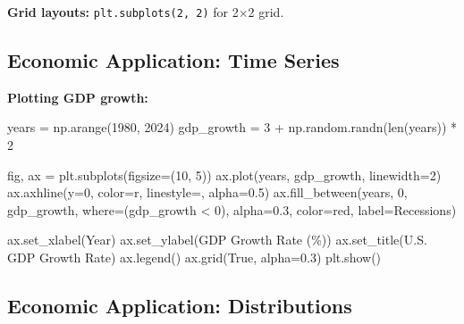 \documentclass[
  letterpaper,
  DIV=11,
  numbers=noendperiod]{scrartcl}
\newenvironment{Shaded}{\begin{snugshade}}{\end{snugshade}}
\newcommand{\BuiltInTok}[1]{\textcolor[rgb]{0.00,0.23,0.31}{#1}}
\newcommand{\DecValTok}[1]{\textcolor[rgb]{0.68,0.00,0.00}{#1}}
\newcommand{\FloatTok}[1]{\textcolor[rgb]{0.68,0.00,0.00}{#1}}
\newcommand{\NormalTok}[1]{\textcolor[rgb]{0.00,0.23,0.31}{#1}}
\newcommand{\OperatorTok}[1]{\textcolor[rgb]{0.37,0.37,0.37}{#1}}
\newcommand{\StringTok}[1]{\textcolor[rgb]{0.13,0.47,0.30}{#1}}
\newcommand{\VariableTok}[1]{\textcolor[rgb]{0.07,0.07,0.07}{#1}}
\begin{document}
\textbf{Grid layouts:} \texttt{plt.subplots(2,\ 2)} for 2×2 grid.

\subsection{Economic Application: Time
Series}\label{economic-application-time-series}

\textbf{Plotting GDP growth:}

\begin{Shaded}
\begin{Highlighting}[]
\NormalTok{years }\OperatorTok{=}\NormalTok{ np.arange(}\DecValTok{1980}\NormalTok{, }\DecValTok{2024}\NormalTok{)}
\NormalTok{gdp\_growth }\OperatorTok{=} \DecValTok{3} \OperatorTok{+}\NormalTok{ np.random.randn(}\BuiltInTok{len}\NormalTok{(years)) }\OperatorTok{*} \DecValTok{2}

\NormalTok{fig, ax }\OperatorTok{=}\NormalTok{ plt.subplots(figsize}\OperatorTok{=}\NormalTok{(}\DecValTok{10}\NormalTok{, }\DecValTok{5}\NormalTok{))}
\NormalTok{ax.plot(years, gdp\_growth, linewidth}\OperatorTok{=}\DecValTok{2}\NormalTok{)}
\NormalTok{ax.axhline(y}\OperatorTok{=}\DecValTok{0}\NormalTok{, color}\OperatorTok{=}\StringTok{\textquotesingle{}r\textquotesingle{}}\NormalTok{, linestyle}\OperatorTok{=}\StringTok{\textquotesingle{}{-}{-}\textquotesingle{}}\NormalTok{, alpha}\OperatorTok{=}\FloatTok{0.5}\NormalTok{)}
\NormalTok{ax.fill\_between(years, }\DecValTok{0}\NormalTok{, gdp\_growth, }
\NormalTok{                 where}\OperatorTok{=}\NormalTok{(gdp\_growth }\OperatorTok{\textless{}} \DecValTok{0}\NormalTok{), }
\NormalTok{                 alpha}\OperatorTok{=}\FloatTok{0.3}\NormalTok{, color}\OperatorTok{=}\StringTok{\textquotesingle{}red\textquotesingle{}}\NormalTok{, label}\OperatorTok{=}\StringTok{\textquotesingle{}Recessions\textquotesingle{}}\NormalTok{)}

\NormalTok{ax.set\_xlabel(}\StringTok{\textquotesingle{}Year\textquotesingle{}}\NormalTok{)}
\NormalTok{ax.set\_ylabel(}\StringTok{\textquotesingle{}GDP Growth Rate (\%)\textquotesingle{}}\NormalTok{)}
\NormalTok{ax.set\_title(}\StringTok{\textquotesingle{}U.S. GDP Growth Rate\textquotesingle{}}\NormalTok{)}
\NormalTok{ax.legend()}
\NormalTok{ax.grid(}\VariableTok{True}\NormalTok{, alpha}\OperatorTok{=}\FloatTok{0.3}\NormalTok{)}
\NormalTok{plt.show()}
\end{Highlighting}
\end{Shaded}

\subsection{Economic Application:
Distributions}\label{economic-application-distributions}
\end{document}
